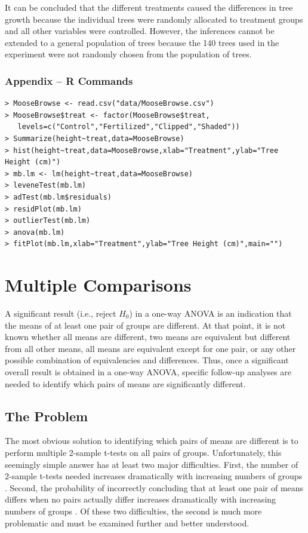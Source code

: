 \documentclass[10pt,openany]{book}\usepackage[]{graphicx}\usepackage[]{color}
\begin{document}
It can be concluded that the different treatments caused the differences in tree growth because the individual trees were randomly allocated to treatment groups and all other variables were controlled.  However, the inferences cannot be extended to a general population of trees because the 140 trees used in the experiment were not randomly chosen from the population of trees.

\vspace{-8pt}
\subsubsection*{Appendix -- R Commands}
\vspace{-8pt}
\begin{Verbatim}[formatcom=\color{red},xleftmargin=5mm,commandchars=\\\{\}]
> MooseBrowse <- read.csv("data/MooseBrowse.csv")
> MooseBrowse$treat <- factor(MooseBrowse$treat,
   levels=c("Control","Fertilized","Clipped","Shaded"))
> Summarize(height~treat,data=MooseBrowse)
> hist(height~treat,data=MooseBrowse,xlab="Treatment",ylab="Tree Height (cm)")
> mb.lm <- lm(height~treat,data=MooseBrowse)
> leveneTest(mb.lm)
> adTest(mb.lm$residuals)
> residPlot(mb.lm)
> outlierTest(mb.lm)
> anova(mb.lm)
> fitPlot(mb.lm,xlab="Treatment",ylab="Tree Height (cm)",main="")
\end{Verbatim}


\section{Multiple Comparisons} \label{sect:MultComp}
A significant result (i.e., reject $H_{0}$) in a one-way ANOVA is an indication that the means of at least one pair of groups are different.  At that point, it is not known whether all means are different, two means are equivalent but different from all other means, all means are equivalent except for one pair, or any other possible combination of equivalencies and differences.  Thus, once a significant overall result is obtained in a one-way ANOVA, specific follow-up analyses are needed to identify which pairs of means are significantly different.


\subsection{The Problem}
The most obvious solution to identifying which pairs of means are different is to perform multiple 2-sample t-tests on all pairs of groups.  Unfortunately, this seemingly simple answer has at least two major difficulties.  First, the number of 2-sample t-tests needed increases dramatically with increasing numbers of groups .  Second, the probability of incorrectly concluding that at least one pair of means differs when no pairs actually differ increases dramatically with increasing numbers of groups .  Of these two difficulties, the second is much more problematic and must be examined further and better understood.
\end{document}
